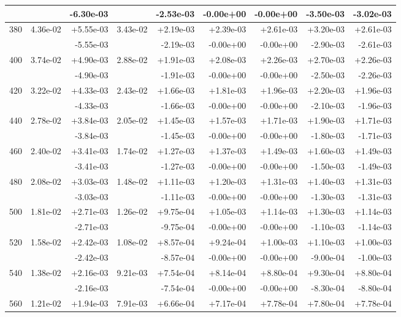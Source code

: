 \begin{tabular}{|c|r|r|r|r|r|r|r|r|}
 & & -6.30e-03  & & -2.53e-03 & -0.00e+00 & -0.00e+00 & -3.50e-03 & -3.02e-03 \\
\hline
380 & 4.36e-02 & +5.55e-03 & 3.43e-02 & +2.19e-03 & +2.39e-03 & +2.61e-03 & +3.20e-03 & +2.61e-03 \\
 & & -5.55e-03  & & -2.19e-03 & -0.00e+00 & -0.00e+00 & -2.90e-03 & -2.61e-03 \\
\hline
400 & 3.74e-02 & +4.90e-03 & 2.88e-02 & +1.91e-03 & +2.08e-03 & +2.26e-03 & +2.70e-03 & +2.26e-03 \\
 & & -4.90e-03  & & -1.91e-03 & -0.00e+00 & -0.00e+00 & -2.50e-03 & -2.26e-03 \\
\hline
420 & 3.22e-02 & +4.33e-03 & 2.43e-02 & +1.66e-03 & +1.81e-03 & +1.96e-03 & +2.20e-03 & +1.96e-03 \\
 & & -4.33e-03  & & -1.66e-03 & -0.00e+00 & -0.00e+00 & -2.10e-03 & -1.96e-03 \\
\hline
440 & 2.78e-02 & +3.84e-03 & 2.05e-02 & +1.45e-03 & +1.57e-03 & +1.71e-03 & +1.90e-03 & +1.71e-03 \\
 & & -3.84e-03  & & -1.45e-03 & -0.00e+00 & -0.00e+00 & -1.80e-03 & -1.71e-03 \\
\hline
460 & 2.40e-02 & +3.41e-03 & 1.74e-02 & +1.27e-03 & +1.37e-03 & +1.49e-03 & +1.60e-03 & +1.49e-03 \\
 & & -3.41e-03  & & -1.27e-03 & -0.00e+00 & -0.00e+00 & -1.50e-03 & -1.49e-03 \\
\hline
480 & 2.08e-02 & +3.03e-03 & 1.48e-02 & +1.11e-03 & +1.20e-03 & +1.31e-03 & +1.40e-03 & +1.31e-03 \\
 & & -3.03e-03  & & -1.11e-03 & -0.00e+00 & -0.00e+00 & -1.30e-03 & -1.31e-03 \\
\hline
500 & 1.81e-02 & +2.71e-03 & 1.26e-02 & +9.75e-04 & +1.05e-03 & +1.14e-03 & +1.30e-03 & +1.14e-03 \\
 & & -2.71e-03  & & -9.75e-04 & -0.00e+00 & -0.00e+00 & -1.10e-03 & -1.14e-03 \\
\hline
520 & 1.58e-02 & +2.42e-03 & 1.08e-02 & +8.57e-04 & +9.24e-04 & +1.00e-03 & +1.10e-03 & +1.00e-03 \\
 & & -2.42e-03  & & -8.57e-04 & -0.00e+00 & -0.00e+00 & -9.00e-04 & -1.00e-03 \\
\hline
540 & 1.38e-02 & +2.16e-03 & 9.21e-03 & +7.54e-04 & +8.14e-04 & +8.80e-04 & +9.30e-04 & +8.80e-04 \\
 & & -2.16e-03  & & -7.54e-04 & -0.00e+00 & -0.00e+00 & -8.30e-04 & -8.80e-04 \\
\hline
560 & 1.21e-02 & +1.94e-03 & 7.91e-03 & +6.66e-04 & +7.17e-04 & +7.78e-04 & +7.80e-04 & +7.78e-04 \\

\end{tabular}
